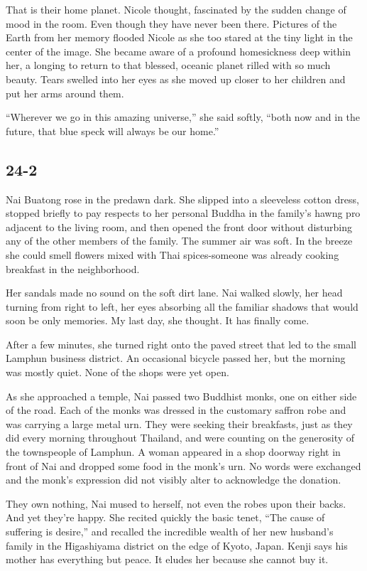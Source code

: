 \documentclass[]{article}
\begin{document}
{That is their home planet.  Nicole thought, fascinated by the sudden change of mood in the room.  Even though they have never been there.  Pictures of the Earth from her memory flooded Nicole as she too stared at the tiny light in the center of the image.  She became aware of a profound homesickness deep within her, a longing to return to that blessed, oceanic planet rilled with so much beauty.  Tears swelled into her eyes as she moved up closer to her children and put her arms around them.

“Wherever we go in this amazing universe,” she said softly, “both now and in the future, that blue speck will always be our home.”


\subsection*{24-2}

Nai Buatong rose in the predawn dark.  She slipped into a sleeveless cotton dress, stopped briefly to pay respects to her personal Buddha in the family’s hawng pro adjacent to the living room, and then opened the front door without disturbing any of the other members of the family.  The summer air was soft.  In the breeze she could smell flowers mixed with Thai spices-someone was already cooking breakfast in the neighborhood.

Her sandals made no sound on the soft dirt lane.  Nai walked slowly, her head turning from right to left, her eyes absorbing all the familiar shadows that would soon be only memories.  My last day, she thought.  It has finally come.

After a few minutes, she turned right onto the paved street that led to the small Lamphun business district.  An occasional bicycle passed her, but the morning was mostly quiet.  None of the shops were yet open.

As she approached a temple, Nai passed two Buddhist monks, one on either side of the road.  Each of the monks was dressed in the customary saffron robe and was carrying a large metal urn.  They were seeking their breakfasts, just as they did every morning throughout Thailand, and were counting on the generosity of the townspeople of Lamphun.  A woman appeared in a shop doorway right in front of Nai and dropped some food in the monk’s urn.  No words were exchanged and the monk’s expression did not visibly alter to acknowledge the donation.

They own nothing, Nai mused to herself, not even the robes upon their backs.  And yet they’re happy.  She recited quickly the basic tenet, “The cause of suffering is desire,” and recalled the incredible wealth of her new husband’s family in the Higashiyama district on the edge of Kyoto, Japan.  Kenji says his mother has everything but peace.  It eludes her because she cannot buy it.

}
\end{document}
